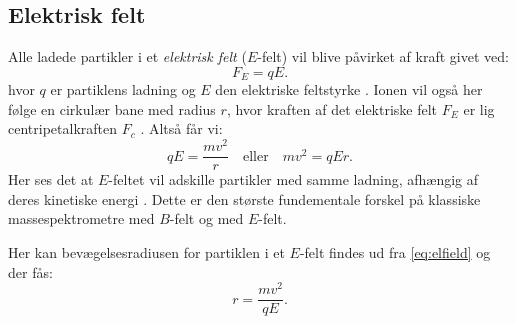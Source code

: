 \subsection{Elektrisk felt}\label{subsec:e-felt}
Alle ladede partikler i et \emph{elektrisk felt} ($E$-felt) vil blive påvirket af kraft givet ved:
\begin{equation}
	F_E = qE.
\end{equation}
hvor $q$ er partiklens ladning og $E$ den elektriske feltstyrke \parencite{orbitAstx}.
Ionen vil også her følge en cirkulær bane med radius $r$, hvor kraften af det elektriske felt $F_E$ er lig centripetalkraften $F_c$ \parencite{mstextbook}. Altså får vi:
\begin{equation}\label{eq:elfield}
	qE = \frac{mv^2}{r}\quad\text{eller}\quad mv^2 = qEr.
\end{equation}
Her ses det at $E$-feltet vil adskille partikler med samme ladning, afhængig af deres kinetiske energi \parencite{massspec}.
Dette er den største fundementale forskel på klassiske massespektrometre med $B$-felt og med $E$-felt.
\par Her kan bevægelsesradiusen for partiklen i et $E$-felt findes ud fra \cref{eq:elfield} og der fås:
\begin{equation}
	r = \frac{mv^2}{qE}.
\end{equation}
